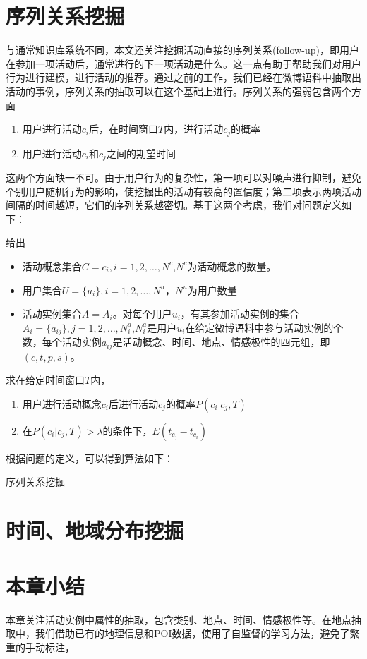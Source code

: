 \section{序列关系挖掘}
与通常知识库系统不同，本文还关注挖掘活动直接的序列关系(follow-up)，即用户在参加一项活动后，通常进行的下一项活动是什么。这一点有助于帮助我们对用户行为进行建模，进行活动的推荐。通过之前的工作，我们已经在微博语料中抽取出活动的事例，序列关系的抽取可以在这个基础上进行。序列关系的强弱包含两个方面
\begin{enumerate}
\item 用户进行活动$c_i$后，在时间窗口$T$内，进行活动$c_j$的概率
\item 用户进行活动$c_i$和$c_j$之间的期望时间
\end{enumerate}
这两个方面缺一不可。由于用户行为的复杂性，第一项可以对噪声进行抑制，避免个别用户随机行为的影响，使挖掘出的活动有较高的置信度；第二项表示两项活动间隔的时间越短，它们的序列关系越密切。基于这两个考虑，我们对问题定义如下：

\begin{problem}[序列关系挖掘]
给出
\begin{itemize}
\item 活动概念集合$C={c_i},i=1,2,\ldots,N^c$,$N^c$为活动概念的数量。
\item 用户集合$U=\{u_i\},i=1,2,\ldots,N^u$，$N^u$为用户数量
\item 活动实例集合$A = {A_i}$。对每个用户$u_i$，有其参加活动实例的集合$A_i = \{a_{ij}\}, j=1,2,\ldots,N_i^a$,$N_i^a$是用户$u_i$在给定微博语料中参与活动实例的个数，每个活动实例$a_{ij}$是活动概念、时间、地点、情感极性的四元组，即$(c,t,p,s)$。
\end{itemize}
求在给定时间窗口$T$内，
\begin{enumerate}
\item 用户进行活动概念$c_i$后进行活动$c_j$的概率$P(c_i|c_j,T)$
\item 在$P(c_i|c_j,T)>\lambda$的条件下，$E(t_{c_j} - t_{c_i})$
\end{enumerate}
\end{problem}

根据问题的定义，可以得到算法如下：

\begin{algorithm}
  \caption{序列关系挖掘 }
  
\end{algorithm}

\section{时间、地域分布挖掘}

\section{本章小结}
本章关注活动实例中属性的抽取，包含类别、地点、时间、情感极性等。在地点抽取中，我们借助已有的地理信息和POI数据，使用了自监督的学习方法，避免了繁重的手动标注，

